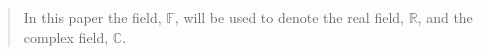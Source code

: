 \begin{abstract}
    In this paper the field, $\mathbb{F}$, will be used to denote the real field, $\mathbb{R}$, and the complex field, $\mathbb{C}$.
\end{abstract}